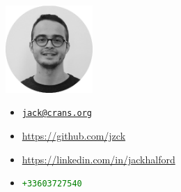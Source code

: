 \begin{minipage}{.25\textwidth}
\includegraphics[width=33mm]{img/jack}
\end{minipage}
\begin{minipage}{.25\textwidth}
\end{minipage}
\begin{minipage}{.60\textwidth}
\begin{itemize}
    \renewcommand\labelitemi{}
    \item \large{\faEnvelope} \textcolor{orange}{\href{mailto:jack+cv@crans.org}{\texttt{jack@crans.org}}}
    \item \large{\faGithub} \textcolor{magenta}{\url{https://github.com/jzck}}
    \item \large{\faLinkedin} \textcolor{cyan}{\url{https://linkedin.com/in/jackhalford}}
    \item \large{\faPhone} \textcolor{green}{\texttt{+33603727540}}
\end{itemize}
\end{minipage}
